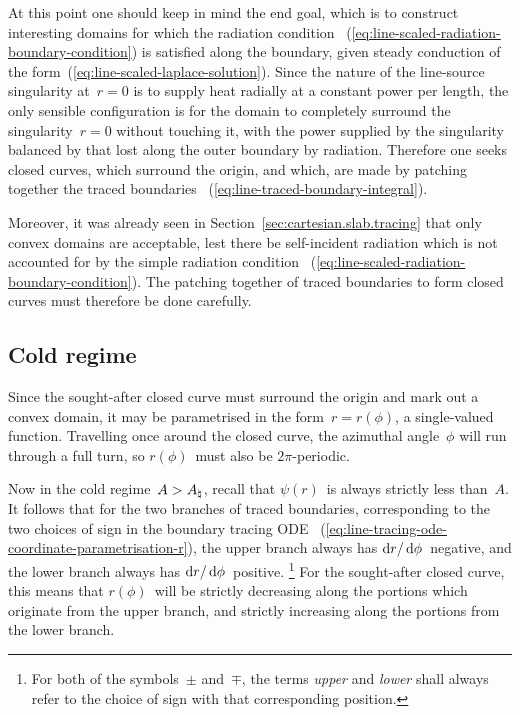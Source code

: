 At this point one should keep in mind the end goal,
which is to construct interesting domains
for which the radiation condition~%
  (\ref{eq:line-scaled-radiation-boundary-condition})
is satisfied along the boundary,
given steady conduction of the form~(\ref{eq:line-scaled-laplace-solution}).
Since the nature of the line-source singularity at~$r = 0$
is to supply heat radially at a constant power per length,
the only sensible configuration is for the domain to
completely surround the singularity~$r = 0$ without touching it,
with the power supplied by the singularity balanced
by that lost along the outer boundary by radiation.
Therefore one seeks closed curves,
which surround the origin,
and which, are made by patching together the traced boundaries~%
  (\ref{eq:line-traced-boundary-integral}).

Moreover, it was already seen in Section~\ref{sec:cartesian.slab.tracing}
that only convex domains are acceptable,
lest there be self-incident radiation which is not accounted for
by the simple radiation condition~%
  (\ref{eq:line-scaled-radiation-boundary-condition}).
The patching together of traced boundaries to form closed curves
must therefore be done carefully.

\subsection{Cold regime}
\label{sec:polar.tracing.cold}

Since the sought-after closed curve must surround the origin
and mark out a convex domain,
it may be parametrised in the form~$r = r (\phi)$,
a single-valued function.
Travelling once around the closed curve,
the azimuthal angle~$\phi$ will run through a full turn,
so $r (\phi)$~must also be $2 \pi$-periodic.

Now in the cold regime~$A > A_\natural$,
recall that $\psi (r)$~is always strictly less than~$A$.
It follows that for the two branches of traced boundaries,
corresponding to the two choices of sign in the boundary tracing ODE~%
  (\ref{eq:line-tracing-ode-coordinate-parametrisation-r}),
the upper branch always has $\mathop{}\!\mathrm{d} r / \mathop{}\!\mathrm{d}\phi$~negative,
and the lower branch always has $\mathop{}\!\mathrm{d} r / \mathop{}\!\mathrm{d}\phi$~positive.%
\footnote{
  For both of the symbols~$\pm$ and~$\mp$,
  the terms \emph{upper} and \emph{lower}
  shall always refer to the choice of sign with that corresponding position.
}
For the sought-after closed curve,
this means that $r (\phi)$~will be strictly decreasing
along the portions which originate from the upper branch,
and strictly increasing along the portions from the lower branch.

